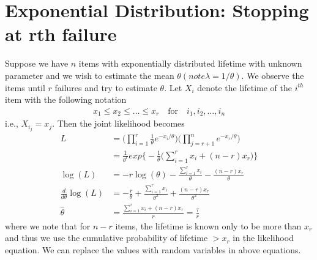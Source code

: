 \documentclass[../probability-notes.tex]{subfiles}
\begin{document}
    \section{Exponential Distribution: Stopping at rth failure}
    Suppose we have $n$ items with exponentially distributed lifetime with unknown parameter and we wish to estimate the mean $\theta (note \lambda = 1/\theta)$. We observe the items until $r$ failures and try to estimate $\theta$. Let $X_{i}$ denote the lifetime of the $i^{th}$ item with the following notation
    \begin{align*}
        x_{1} \leq x_{2} \leq \ldots \leq x_{r} \quad \text{for} \quad i_{1}, i_{2}, \ldots, i_{n}
    \end{align*}
    i.e., $X_{i_{j}} = x_{j}$. Then the joint likelihood becomes
    \begin{align*}
        L &= \big(\prod_{i=1}^{r} \frac{1}{\theta}e^{-x_{i}/\theta}\big) \big(\prod_{j=r+1}^{n} e^{-x_{r}/\theta}\big)\\
        &= \frac{1}{\theta^{r}}exp \big\{-\frac{1}{\theta} \big(\sum_{i=1}^{r} x_{i} + (n-r)x_{r} \big) \big\}\\
        \log(L) &= -r\log(\theta) - \frac{\sum_{i=1}^{r} x_{i}}{\theta} - \frac{(n-r)x_{r}}{\theta}\\
        \frac{d}{d\theta}\log(L) &= -\frac{r}{\theta} + \frac{\sum_{i=1}^{r} x_{i}}{\theta^{2}} + \frac{(n-r)x_{r}}{\theta^{2}}\\
        \hat{\theta} &= \frac{\sum_{i=1}^{r} x_{i} + (n-r)x_{r}}{r} = \frac{\tau}{r}
    \end{align*}
    where we note that for $n-r$ items, the lifetime is known only to be more than $x_{r}$ and thus we use the cumulative probability of lifetime $> x_{r}$ in the likelihood equation. We can replace the values with random variables in above equations.\newline
\end{document}
